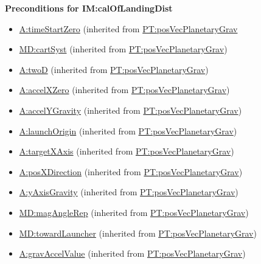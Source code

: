\documentclass[12pt]{article}
\begin{document}
\noindent \textbf{Preconditions for IM:calOfLandingDist}
\begin{itemize}
\item \hyperref[timeStartZero]{A:timeStartZero} (inherited from \hyperref[PT:posVecPlanetaryGrav]{PT:posVecPlanetaryGrav}
\item \hyperref[MD:cartSyst]{MD:cartSyst} (inherited from \hyperref[PT:posVecPlanetaryGrav]{PT:posVecPlanetaryGrav})
\item \hyperref[twoD]{A:twoD} (inherited from \hyperref[PT:posVecPlanetaryGrav]{PT:posVecPlanetaryGrav})
\item \hyperref[accelXZero]{A:accelXZero} (inherited from \hyperref[PT:posVecPlanetaryGrav]{PT:posVecPlanetaryGrav})
\item \hyperref[accelYGravity]{A:accelYGravity} (inherited from \hyperref[PT:posVecPlanetaryGrav]{PT:posVecPlanetaryGrav})
\item \hyperref[launchOrigin]{A:launchOrigin} (inherited from \hyperref[PT:posVecPlanetaryGrav]{PT:posVecPlanetaryGrav})
\item \hyperref[targetXAxis]{A:targetXAxis} (inherited from \hyperref[PT:posVecPlanetaryGrav]{PT:posVecPlanetaryGrav})
\item \hyperref[posXDirection]{A:posXDirection} (inherited from \hyperref[PT:posVecPlanetaryGrav]{PT:posVecPlanetaryGrav})
\item \hyperref[yAxisGravity]{A:yAxisGravity} (inherited from \hyperref[PT:posVecPlanetaryGrav]{PT:posVecPlanetaryGrav})
\item \hyperref[MD:magAngleRep]{MD:magAngleRep} (inherited from \hyperref[PT:posVecPlanetaryGrav]{PT:posVecPlanetaryGrav})
\item \hyperref[MD:towardLauncher]{MD:towardLauncher} (inherited from \hyperref[PT:posVecPlanetaryGrav]{PT:posVecPlanetaryGrav})
\item \hyperref[gravAccelValue]{A:gravAccelValue} (inherited from \hyperref[PT:posVecPlanetaryGrav]{PT:posVecPlanetaryGrav})

\end{itemize}
\end{document}
